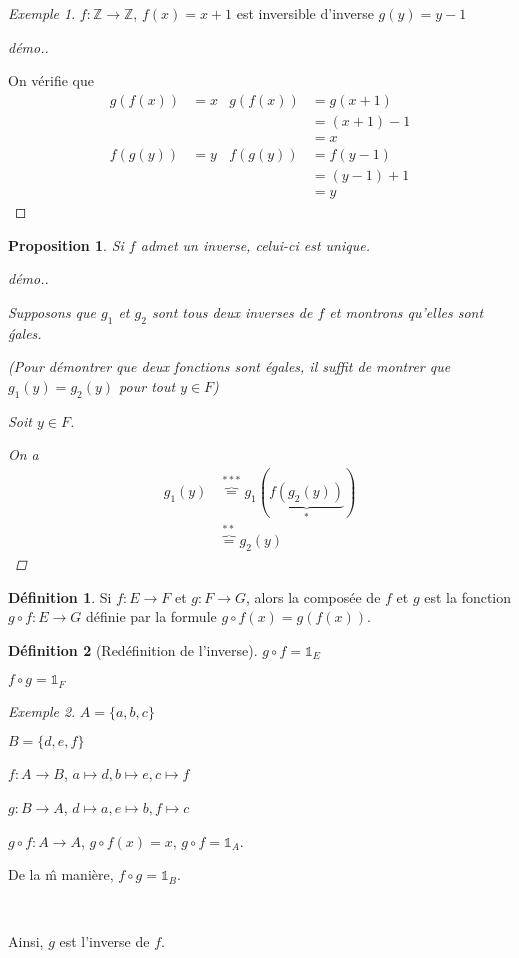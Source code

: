 \documentclass{report}
\newcommand*{\entiers}{\mathbb{Z}}
\newtheorem*{prop}{Proposition}
\theoremstyle{definition}
\newtheorem*{defin}{D\'efinition}
\theoremstyle{remark}
\newtheorem*{exem}{Exemple}
\begin{document}
	\begin{exem}
		$f:\entiers \to \entiers$, $f(x)=x+1$ est inversible d'inverse $g(y)=y-1$

		\begin{proof}[d\'emo.]
			~

			On v\'erifie que
			\begin{align*}
				g(f(x))&= x& g(f(x))&= g(x+1)\\
				&&&= (x+1)-1\\
				&&&= x\\
				f(g(y))&= y& f(g(y))&= f(y-1)\\
				&&&= (y-1)+1\\
				&&&= y
			\end{align*}
		\end{proof}
	\end{exem}

	\begin{prop}
		Si $f$ admet un inverse, celui-ci est unique.

		\begin{proof}[d\'emo.]
			~

			Supposons que $g_1$ et $g_2$ sont tous deux inverses de $f$ et montrons qu'elles sont \'gales.

			(Pour d\'emontrer que deux fonctions sont \'egales, il suffit de montrer que $g_1(y)=g_2(y)$ pour tout $y \in F$)

			Soit $y \in F$.

			On a
			\begin{align*}
				g_1(y)&\overbrace{=}^{***} g_1(\underbrace{f(g_2(y))}_{*})\\
				&\overbrace{=}^{**} g_2(y)
			\end{align*}
		\end{proof}
	\end{prop}

	\begin{defin}
		Si $f:E \to F$ et $g:F \to G$, alors la compos\'ee de $f$ et $g$ est la fonction $g \circ f:E \to G$ d\'efinie par la formule $g \circ f(x)=g(f(x))$.
	\end{defin}

	\begin{defin}[Red\'efinition de l'inverse]
		$g \circ f=\mathds{1}_E$

		$f \circ g=\mathds{1}_F$
	\end{defin}

	\begin{exem}
		$A=\{a,b,c\}$

		$B=\{d,e,f\}$

		$f:A \to B$, $a \mapsto d, b \mapsto e, c \mapsto f$

		$g:B \to A$, $d \mapsto a, e \mapsto b, f \mapsto c$

		$g \circ f:A \to A$, $g \circ f(x)=x$, $g \circ f=\mathds{1}_A$.

		De la \^m mani\`ere, $f \circ g=\mathds{1}_B$.

		~

		Ainsi, $g$ est l'inverse de $f$.
	\end{exem}
\end{document}
